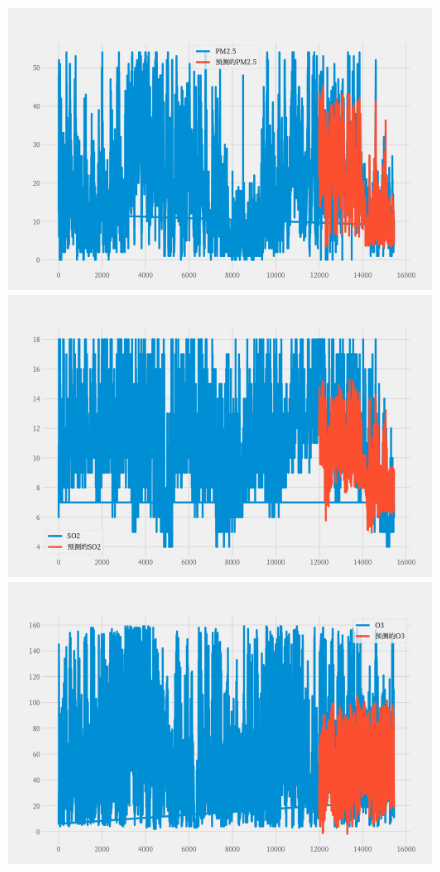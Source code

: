 \documentclass[a4paper,10pt]{my_paper}
\numberwithin{equation}{section}
\begin{document}
\begin{figure}[htbp]
\begin{minipage}[c]{0.3\textwidth}
		\end{minipage}
		\begin{minipage}[c]{0.3\textwidth}
			\centering
			\includegraphics[width=1\textwidth]{prob4/预测A1地_PM2..pdf} 
		\end{minipage}
    \begin{minipage}[c]{0.3\textwidth}
			\centering
			\includegraphics[width=1\textwidth]{prob4/预测A1地_SO2.pdf} 
		\end{minipage}
    \begin{minipage}[c]{0.3\textwidth}
			\centering
			\includegraphics[width=1\textwidth]{prob4/预测A1地_O3.pdf} 

\end{minipage}
\end{figure}
\end{document}
